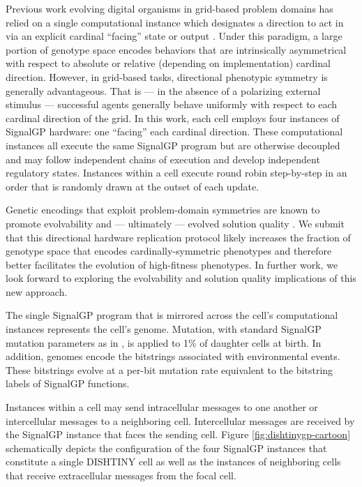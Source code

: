 Previous work evolving digital organisms in grid-based problem domains has relied on a single computational instance which designates a direction to act in via an explicit cardinal ``facing'' state or output \cite{goldsby2014evolutionary, goldsby2018serendipitous, grabowski2010early, biswas2014causes, lalejini2018evolving}.
Under this paradigm, a large portion of genotype space encodes behaviors that are intrinsically asymmetrical with respect to absolute or relative (depending on implementation) cardinal direction.
However, in grid-based tasks, directional phenotypic symmetry is generally advantageous.
That is --- in the absence of a polarizing external stimulus --- successful agents generally behave uniformly with respect to each cardinal direction of the grid.
In this work, each cell employs four instances of SignalGP hardware: one ``facing'' each cardinal direction.
These computational instances all execute the same SignalGP program but are otherwise decoupled and may follow independent chains of execution and develop independent regulatory states.
Instances within a cell execute round robin step-by-step in an order that is randomly drawn at the outset of each update.

Genetic encodings that exploit problem-domain symmetries are known to promote evolvability and --- ultimately --- evolved solution quality \cite{clune2011performance, cheney2014unshackling}.
We submit that this directional hardware replication protocol likely increases the fraction of genotype space that encodes cardinally-symmetric phenotypes and therefore better facilitates the evolution of high-fitness phenotypes.
In further work, we look forward to exploring the evolvability and solution quality implications of this new approach.

The single SignalGP program that is mirrored across the cell's computational instances represents the cell's genome.
Mutation, with standard SignalGP mutation parameters as in \cite{lalejini2018evolving}, is applied to 1\% of daughter cells at birth.
In addition, genomes encode the bitstrings associated with environmental events.
These bitstrings evolve at a per-bit mutation rate equivalent to the bitstring labels of SignalGP functions.

Instances within a cell may send intracellular messages to one another or intercellular messages to a neighboring cell.
Intercellular messages are received by the SignalGP instance that faces the sending cell.
Figure \ref{fig:dishtinygp-cartoon} schematically depicts the configuration of the four SignalGP instances that constitute a single DISHTINY cell as well as the instances of neighboring cells that receive extracellular messages from the focal cell.


